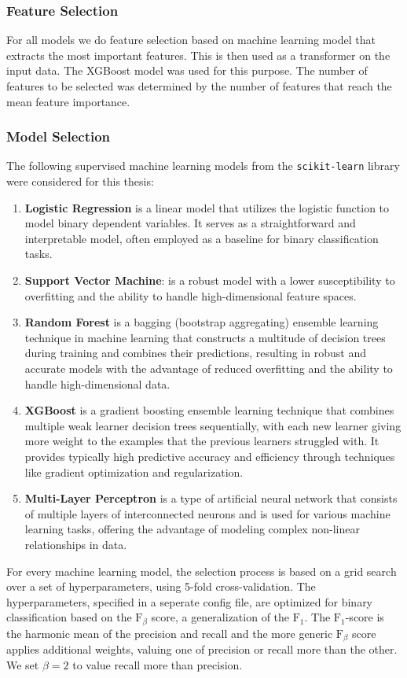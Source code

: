 \subsubsection{Feature Selection}
For all models we do feature selection based on machine learning model that extracts the most important features. This is then used as a transformer on the input data. The XGBoost model was used for this purpose. The number of features to be selected was determined by the number of features that reach the mean feature importance. 
\subsubsection{Model Selection}
The following supervised machine learning models from the \texttt{scikit-learn} library were considered for this thesis: 
\begin{enumerate}
    \item \textbf{Logistic Regression} is a linear model that utilizes the logistic function to model binary dependent variables. It serves as a straightforward and interpretable model, often employed as a baseline for binary classification tasks.
    \item \textbf{Support Vector Machine}: is a robust model with a lower susceptibility to overfitting and the ability to handle high-dimensional feature spaces.
    \item \textbf{Random Forest} is a bagging (bootstrap aggregating) ensemble learning technique in machine learning that constructs a multitude of decision trees during training and combines their predictions, resulting in robust and accurate models with the advantage of reduced overfitting and the ability to handle high-dimensional data.
    \item \textbf{XGBoost} is a gradient boosting ensemble learning technique that combines multiple weak learner decision trees sequentially, with each new learner giving more weight to the examples that the previous learners struggled with. It provides typically high predictive accuracy and efficiency through techniques like gradient optimization and regularization.
    \item \textbf{Multi-Layer Perceptron} is a type of artificial neural network that consists of multiple layers of interconnected neurons and is used for various machine learning tasks, offering the advantage of modeling complex non-linear relationships in data.
\end{enumerate}

For every machine learning model, the selection process is based on a grid search over a set of hyperparameters, using 5-fold cross-validation. The hyperparameters, specified in a seperate config file, are optimized for binary classification based on the $\text{F}_{\beta}$ score, a generalization of the $\text{F}_{1}$. The $\text{F}_{1}$-score is the harmonic mean of the precision and recall and the more generic $\text{F}_{\beta}$ score applies additional weights, valuing one of precision or recall more than the other. We set $\beta=2$ to value recall more than precision. 


